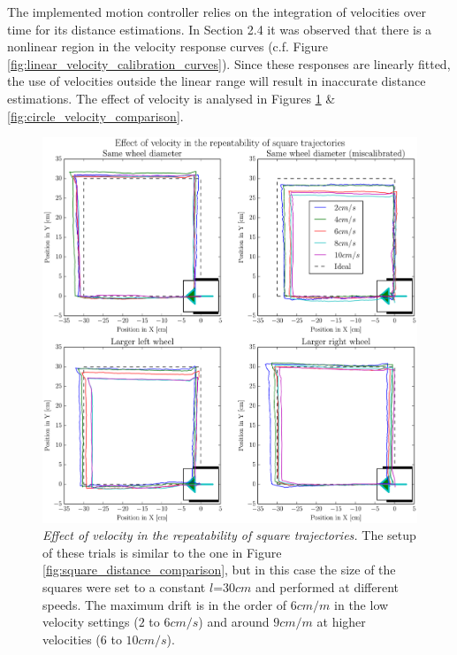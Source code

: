 \documentclass[12pt,twoside]{report}
\begin{document}
The implemented motion controller relies on the integration of velocities over time for its distance estimations.
In Section 2.4 it was observed that there is a nonlinear region in the velocity response curves (c.f. Figure \ref{fig:linear_velocity_calibration_curves}). Since these responses are linearly fitted, the use of velocities outside the linear range will result in inaccurate distance estimations. The effect of velocity is analysed in Figures \ref{fig:square_velocity_comparison} \& \ref{fig:circle_velocity_comparison}.

\begin{figure}[hbtp]
\centerline{\includegraphics[width=0.95\linewidth]{square_velocity_comparison}}
\caption[Effect of velocity in the repeatability of square trajectories]{\emph{Effect of velocity in the repeatability of square trajectories.}
The setup of these trials is similar to the one in Figure \ref{fig:square_distance_comparison}, but in this case the size of the squares were set to a constant $l$=$30cm$ and performed at different speeds.
The maximum drift is in the order of $6cm/m$ in the low velocity settings ($2$ to $6cm/s$) and around $9cm/m$ at higher velocities ($6$ to $10cm/s$).
}
\label{fig:square_velocity_comparison}
\end{figure}
\end{document}
